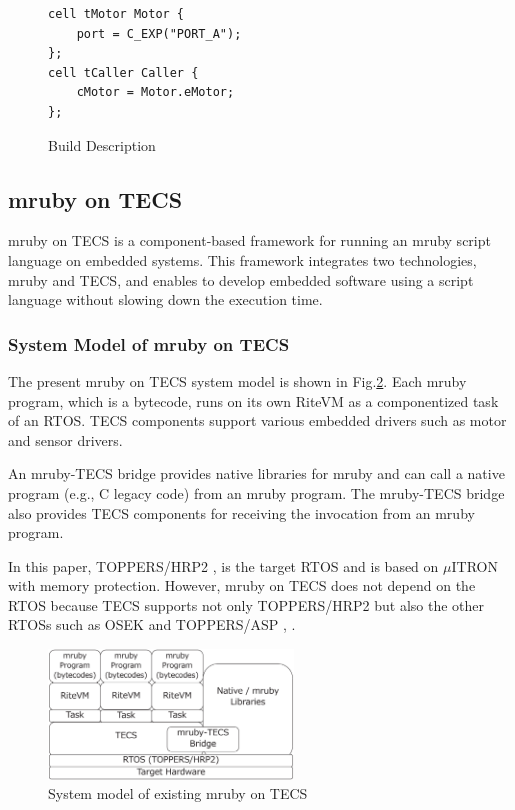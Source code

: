 \documentclass[S,R,E]{article/compsoft}
\begin{document}
\begin{description}
\begin{figure}[t]
\centering
\begin{lstlisting}
cell tMotor Motor {
    port = C_EXP("PORT_A");
};
cell tCaller Caller {
    cMotor = Motor.eMotor;
};
\end{lstlisting}
\caption{Build Description}
\label{build}
\end{figure}

\end{description}

\subsection{mruby on TECS}
\label{sec:mruby on TECS}
mruby on TECS is a component-based framework for running an mruby script language on embedded systems.
This framework integrates two technologies, mruby and TECS, and enables to develop embedded software using a script language without slowing down the execution time. 

\subsubsection{System Model of mruby on TECS}
The present mruby on TECS system model is shown in Fig.\ref{fig:mrubyontecs}.
Each mruby program, which is a bytecode, runs on its own RiteVM as a componentized task of an RTOS.
TECS components support various embedded drivers such as motor and sensor drivers.

An mruby-TECS bridge provides native libraries for mruby and can call a native program (e.g., C legacy code) from an mruby program.
The mruby-TECS bridge also provides TECS components for receiving the invocation from an mruby program.

In this paper, TOPPERS/HRP2 \cite{url:HRP2}, \cite{par:hr-tecs} is the target RTOS and is based on $\mu$ITRON \cite{par:microITRON} with memory protection.
However, mruby on TECS does not depend on the RTOS because TECS supports not only TOPPERS/HRP2 but also the other RTOSs such as OSEK \cite{par:OSEK} and TOPPERS/ASP \cite{par:ASP}, \cite{url:ASP}.

\begin{figure}[t]
    \centering
    \includegraphics[width=6.5cm,clip]{figure/mrubyontecs.eps}
\caption{System model of existing mruby on TECS}
\label{fig:mrubyontecs}
\end{figure}
\end{document}
